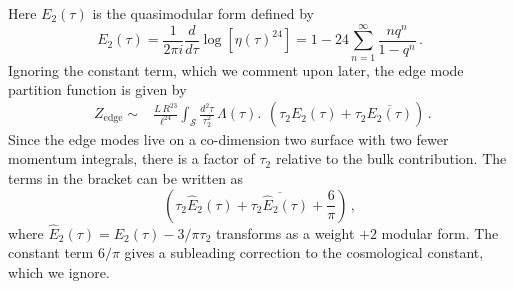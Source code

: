 \documentclass[aps,prl, reprint, superscriptaddress, 10pt]{revtex4-2}
\renewcommand{\t}{\tau}
\newcommand{\1}{\textbf{1}}
\newcommand{\+}{{\,+ \,}}
\begin{document}
Here $E_2(\tau)$ is the quasimodular form defined by
\begin{equation}\label{E2}
	E_2(\tau) = \frac{1}{2\pi i }\frac{d}{d\tau} \log [\eta(\tau)^{24}] = 1 -24 \sum_{n=1}^\infty \frac{n q^n}{ 1-q^n} \, .
\end{equation}
Ignoring the constant term, which we comment upon later, the edge mode partition function is given by
\begin{equation}
	\begin{split}
	Z_{\text{edge}} \sim & \frac{L\,R^{23}}{ \ell^{ 24} } \int_{\mathcal{S}} \frac{d^2\tau}{\tau_2^2}\, \Lambda (\tau) .
	\end{split} \left( \t_2 E_2(\tau) + \t_2 \overline{E_2(\tau)}\right) \, .
\end{equation}
Since the edge modes live on a co-dimension two surface with two fewer momentum integrals, there is a factor of $\tau_2$ relative to the bulk contribution. The terms in the bracket can be written as
\begin{equation}
	\left( \tau_2 \hat E_2(\tau) + \overline{\tau_2 \hat E_2(\tau) } + \frac{6}{\pi }\right) \, ,
\end{equation}
where $\hat E_2(\t) = E_2(\t) -3/{\pi\t_2}$ transforms as a weight $+2$ modular form. The constant term $6/\pi$ gives a subleading correction to the cosmological constant, which we ignore.
\end{document}

